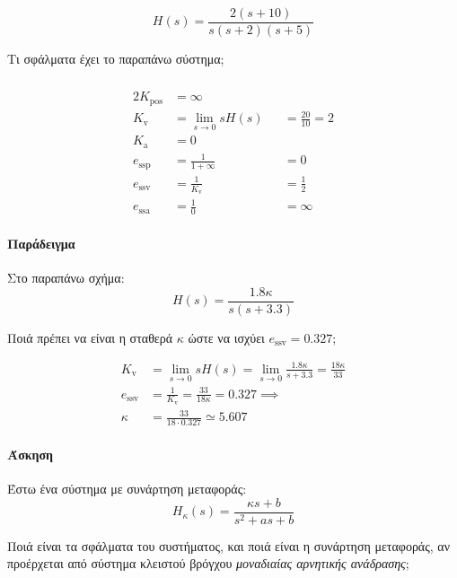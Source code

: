 \documentclass[11pt,a4paper,notitlepage,fleqn,draft]{article}
\begin{document}
\[
H(s) = \frac{2(s+10)}{s(s+2)(s+5)}
\]

Τι σφάλματα έχει το παραπάνω σύστημα;
\subparagraph{}
\begin{alignat*}{2}
K_{\mathrm{pos}} &= \infty \\
K_{\mathrm v}	 &= \lim_{s\to 0} sH(s) &&= \frac{20}{10} = 2 \\
K_{\mathrm a}    &= 0 \\[2ex]
e_{\mathrm{ssp}} &= \frac{1}{1+\infty} &&= 0 \\
e_{\mathrm{ssv}} &= \frac{1}{K_{\mathrm v}} &&= \frac{1}{2} \\
e_{\mathrm{ssa}} &= \frac{1}{0} &&= \infty
\end{alignat*}

\paragraph{Παράδειγμα} \hspace{0pt}


Στο παραπάνω σχήμα:
\[
H(s) = \frac{1.8κ}{s(s+3.3)}
\]

Ποιά πρέπει να είναι η σταθερά \( κ \) ώστε να ισχύει \( e_{\mathrm{ssv}} = 0.327 \);

\begin{align*}
	K_{\mathrm{v}} &= \lim_{s\to 0}
	sH(s) = \lim_{s \to 0} \frac{1.8κ}{s+3.3} = \frac{18κ}{33} \\
	e_{\mathrm{ssv}} &= \frac{1}{K_{\mathrm v}}
	= \frac{33}{18κ} = 0.327 \implies \\
	κ &= \frac{33}{18\cdot 0.327} \simeq 5.607
\end{align*}

\paragraph{Άσκηση}
Έστω ένα σύστημα με συνάρτηση μεταφοράς:
\[
H_{κ}(s) = \frac{κs+b}{s^2+as+b}
\]

Ποιά είναι τα σφάλματα του συστήματος, και ποιά είναι η συνάρτηση μεταφοράς, αν προέρχεται
από σύστημα κλειστού βρόγχου \textit{μοναδιαίας αρνητικής ανάδρασης};
\end{document}
